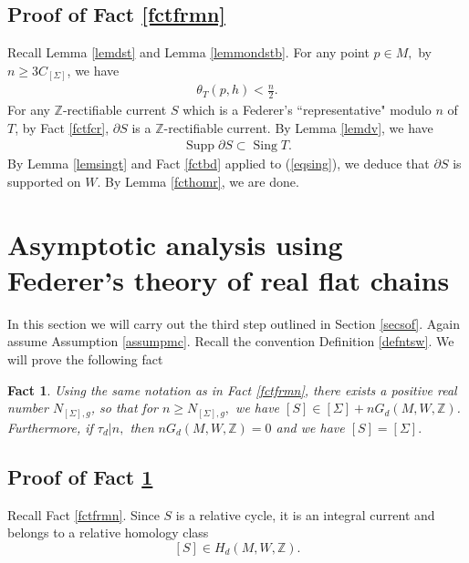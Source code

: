 \documentclass[11pt,a4paper]{amsart}
\numberwithin{equation}{section}
\newcommand{\sing}{\operatorname{Sing}}
\newcommand{\Si}{\Sigma}
\newcommand{\ta}{\theta}
\newcommand{\s}{\subset}
\newcommand{\spt}{\operatorname{Supp}}
\newcommand{\pd}{\partial}
\newcommand{\Z}{\mathbb{Z}}
\theoremstyle{plain}
\newtheorem{fact}{Fact}[subsection]
\theoremstyle{definition}
\numberwithin{equation}{subsection}
\begin{document}
\subsection{Proof of Fact \ref{fctfrmn}}\label{subsectionfed}Recall Lemma \ref{lemdst} and Lemma \ref{lemmondstb}. For any point $p\in M,$ by $n\ge 3C_{[\Si]}$, we have
\begin{align}\label{indst}
	\ta_T(p,h)<\frac{n}{2}.
\end{align}For any $\Z$-rectifiable current $S$ which is a Federer's ``representative" modulo $n$ of $T$, by Fact \ref{fctfcr}, $\pd S$ is a $\Z$-rectifiable current. By Lemma \ref{lemdv}, we have\begin{align}\label{eqsing}
	\spt \pd S\s\sing T.
\end{align}
By Lemma \ref{lemsingt} and Fact \ref{fctbd} applied to (\ref{eqsing}), we deduce that $\pd S$ is supported on $W.$ By Lemma \ref{fcthomr}, we are done.\section{Asymptotic analysis using Federer's theory of real flat chains}\label{secfed}In this section we will carry out the third step outlined in Section \ref{secsof}. Again assume Assumption \ref{assumpmc}. Recall the convention Definition \ref{defntsw}. We will prove the following fact
\begin{fact}\label{fctm}
Using the same notation as in Fact \ref{fctfrmn}, there exists a positive real number $N_{[\Si],g}$, so that for $n\ge N_{[\Si],g},$  we have $[S]\in[\Si]+nG_d(M,W,\Z)$. 	Furthermore, if $\tau_d|n,$ then $nG_d(M,W,\Z)=0$ and we have $[S]=[\Si].$
\end{fact}
	\subsection{Proof of Fact \ref{fctm}}\label{subsectiona} 
Recall Fact \ref{fctfrmn}. Since $S$ is a relative cycle, it is an integral current and belongs to a relative homology class $$[S]\in H_d(M,W,\Z).$$
\end{document}
